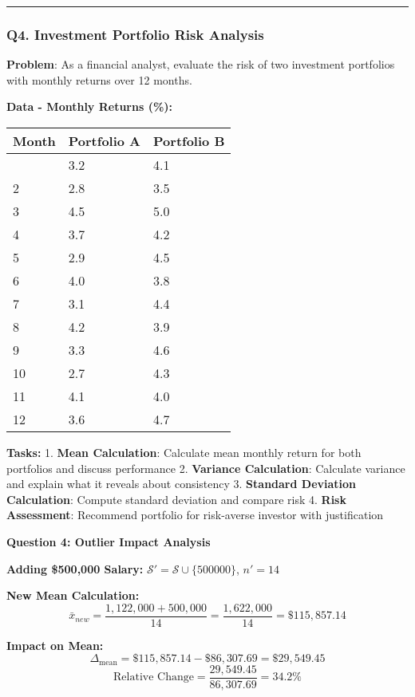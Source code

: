 \documentclass[11pt]{article}
\begin{document}
    \begin{center}\rule{0.5\linewidth}{0.5pt}\end{center}

\subsubsection{Q4. Investment Portfolio Risk
Analysis}\label{q4.-investment-portfolio-risk-analysis}

\textbf{Problem}: As a financial analyst, evaluate the risk of two
investment portfolios with monthly returns over 12 months.

\textbf{Data - Monthly Returns (\%):}

\begin{longtable}[]{@{}lll@{}}
\toprule\noalign{}
Month & Portfolio A & Portfolio B \\
\midrule\noalign{}
\endhead
\bottomrule\noalign{}
\endlastfoot
1 & 3.2 & 4.1 \\
2 & 2.8 & 3.5 \\
3 & 4.5 & 5.0 \\
4 & 3.7 & 4.2 \\
5 & 2.9 & 4.5 \\
6 & 4.0 & 3.8 \\
7 & 3.1 & 4.4 \\
8 & 4.2 & 3.9 \\
9 & 3.3 & 4.6 \\
10 & 2.7 & 4.3 \\
11 & 4.1 & 4.0 \\
12 & 3.6 & 4.7 \\
\end{longtable}

\textbf{Tasks:} 1. \textbf{Mean Calculation}: Calculate mean monthly
return for both portfolios and discuss performance 2. \textbf{Variance
Calculation}: Calculate variance and explain what it reveals about
consistency 3. \textbf{Standard Deviation Calculation}: Compute standard
deviation and compare risk 4. \textbf{Risk Assessment}: Recommend
portfolio for risk-averse investor with justification

\textbf{Question 4: Outlier Impact Analysis}

\textbf{Adding \$500,000 Salary:}
\(\mathcal{S}' = \mathcal{S} \cup \{500000\}\), \(n' = 14\)

\textbf{New Mean Calculation:}
\[\bar{x}_{new} = \frac{1,122,000 + 500,000}{14} = \frac{1,622,000}{14} = \$115,857.14\]

\textbf{Impact on Mean:}
\[\Delta_{\text{mean}} = \$115,857.14 - \$86,307.69 = \$29,549.45\]
\[\text{Relative Change} = \frac{29,549.45}{86,307.69} = 34.2\%\]
\end{document}
